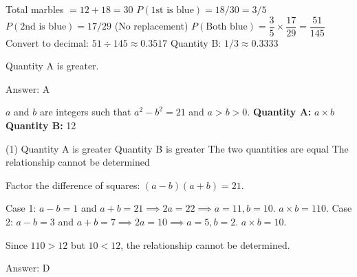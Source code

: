 \documentclass[11pt,paper=a4,answers]{exam}
\begin{document}
\begin{questions}
\begin{solution}
\begin{center}
Total marbles $= 12 + 18 = 30$
\vspace{5pt}
$P(\text{1st is blue}) = 18/30 = 3/5$
\vspace{5pt}
$P(\text{2nd is blue}) = 17/29$ (No replacement)
\vspace{10pt}
$P(\text{Both blue}) = \dfrac{3}{5} \times \dfrac{17}{29} = \dfrac{51}{145}$
\vspace{5pt}
Convert to decimal: $51 \div 145 \approx 0.3517$
\vspace{5pt}
Quantity B: $1/3 \approx 0.3333$
\end{center}
\vspace{5pt}
Quantity A is greater.

Answer: \colorbox{yellow!100}{A}
\end{solution}

\vspace{1cm}

\question
$a$ and $b$ are integers such that $a^2 - b^2 = 21$ and $a > b > 0$.
\vspace{5pt}
\textbf{Quantity A: } $a \times b$ \\
\vspace{5pt}
\textbf{Quantity B: } 12

\begin{tasks}(1)
\task[A)] Quantity A is greater
\task[B)] Quantity B is greater
\task[C)] The two quantities are equal
\task[D)] The relationship cannot be determined
\end{tasks}

\begin{solution}
Factor the difference of squares: $(a-b)(a+b) = 21$.
\vspace{5pt}
\begin{center}
Case 1: $a-b=1$ and $a+b=21 \implies 2a=22 \implies a=11, b=10$.
\vspace{5pt}
$a \times b = 110$.
\vspace{10pt}
Case 2: $a-b=3$ and $a+b=7 \implies 2a=10 \implies a=5, b=2$.
\vspace{5pt}
$a \times b = 10$.
\end{center}
\vspace{5pt}
Since $110 > 12$ but $10 < 12$, the relationship cannot be determined.

Answer: \colorbox{yellow!100}{D}
\end{solution}

\vspace{1cm}


\end{questions}
\end{document}
